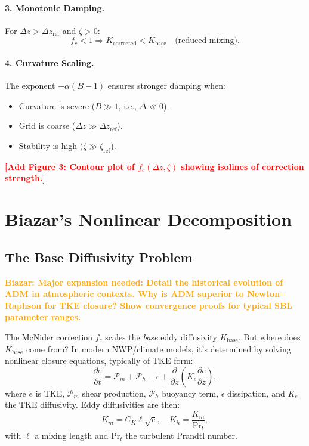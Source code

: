 \documentclass[twocolumn,11pt]{article}
\newcommand{\TODO}[1]{\textcolor{red}{\textbf{[#1]}}}
\newcommand{\BIAZAR}[1]{\textcolor{orange}{\textbf{Biazar: #1}}}
\begin{document}
\paragraph{3. Monotonic Damping.} For $\Delta z > \Delta z_{\text{ref}}$ and $\zeta > 0$:
\begin{equation}
f_c < 1 \Rightarrow K_{\text{corrected}} < K_{\text{base}} \quad \text{(reduced mixing)}.
\end{equation}

\paragraph{4. Curvature Scaling.} The exponent $-\alpha(B-1)$ ensures stronger damping when:
\begin{itemize}
\item Curvature is severe ($B \gg 1$, i.e., $\Delta \ll 0$).
\item Grid is coarse ($\Delta z \gg \Delta z_{\text{ref}}$).
\item Stability is high ($\zeta \gg \zeta_{\text{ref}}$).
\end{itemize}

\TODO{Add Figure 3: Contour plot of $f_c(\Delta z, \zeta)$ showing isolines of correction strength.}

\section{Biazar's Nonlinear Decomposition}
\label{sec:biazar}

\subsection{The Base Diffusivity Problem}

\BIAZAR{Major expansion needed: Detail the historical evolution of ADM in atmospheric contexts. Why is ADM superior to Newton--Raphson for TKE closure? Show convergence proofs for typical SBL parameter ranges.}

The McNider correction $f_c$ scales the \textit{base} eddy diffusivity $K_{\text{base}}$. But where does $K_{\text{base}}$ come from? In modern NWP/climate models, it's determined by solving nonlinear closure equations, typically of TKE form:
\begin{equation}
\frac{\partial e}{\partial t} = \mathcal{P}_m + \mathcal{P}_h - \epsilon + \frac{\partial}{\partial z}\left(K_e \frac{\partial e}{\partial z}\right),
\label{eq:TKE_prognostic}
\end{equation}
where $e$ is TKE, $\mathcal{P}_m$ shear production, $\mathcal{P}_h$ buoyancy term, $\epsilon$ dissipation, and $K_e$ the TKE diffusivity. Eddy diffusivities are then:
\begin{equation}
K_m = C_K \ell \sqrt{e}, \quad K_h = \frac{K_m}{\text{Pr}_t},
\end{equation}
with $\ell$ a mixing length and $\text{Pr}_t$ the turbulent Prandtl number.
\end{document}
